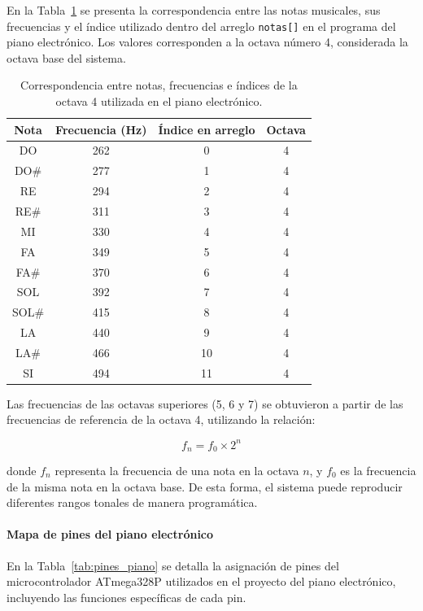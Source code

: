 En la Tabla~\ref{tab:notas_piano} se presenta la correspondencia entre las notas musicales, 
sus frecuencias y el índice utilizado dentro del arreglo \texttt{notas[]} en el programa del piano electrónico. 
Los valores corresponden a la octava número 4, considerada la octava base del sistema. 

\begin{table}[H]
\centering
\begin{tabular}{|c|c|c|c|}
\hline
\textbf{Nota} & \textbf{Frecuencia (Hz)} & \textbf{Índice en arreglo} & \textbf{Octava} \\
\hline
DO  & 262 & 0  & 4 \\
DO\# & 277 & 1  & 4 \\
RE  & 294 & 2  & 4 \\
RE\# & 311 & 3  & 4 \\
MI  & 330 & 4  & 4 \\
FA  & 349 & 5  & 4 \\
FA\# & 370 & 6  & 4 \\
SOL & 392 & 7  & 4 \\
SOL\# & 415 & 8  & 4 \\
LA  & 440 & 9  & 4 \\
LA\# & 466 & 10 & 4 \\
SI  & 494 & 11 & 4 \\
\hline
\end{tabular}
\caption{Correspondencia entre notas, frecuencias e índices de la octava 4 utilizada en el piano electrónico.}
\label{tab:notas_piano}
\end{table}

Las frecuencias de las octavas superiores (5, 6 y 7) se obtuvieron a partir de las frecuencias de referencia de la octava 4, 
utilizando la relación:

\[
f_{n} = f_{0} \times 2^{n}
\]

donde \( f_{n} \) representa la frecuencia de una nota en la octava \( n \), 
y \( f_{0} \) es la frecuencia de la misma nota en la octava base. 
De esta forma, el sistema puede reproducir diferentes rangos tonales de manera programática.

\vspace{0.5cm}

\paragraph{Mapa de pines del piano electrónico}

En la Tabla~\ref{tab:pines_piano} se detalla la asignación de pines del microcontrolador ATmega328P utilizados en el proyecto del piano electrónico, incluyendo las funciones específicas de cada pin.

